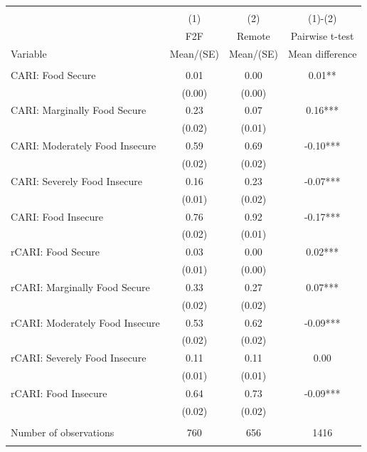
\begin{tabular}{@{\extracolsep{5pt}}lccc}
\\[-1.8ex]\hline \hline \\[-1.8ex]
 & \multicolumn{1}{c}{(1)}  & \multicolumn{1}{c}{(2)}  & \multicolumn{1}{c}{(1)-(2)} \\
 & \multicolumn{1}{c}{F2F}  & \multicolumn{1}{c}{Remote}  & \multicolumn{1}{c}{Pairwise t-test}  \\
Variable & Mean/(SE) & Mean/(SE) & Mean difference \\ \hline \\[-1.8ex] 
CARI: Food Secure   & 0.01    & 0.00    & 0.01**   \\
 & (0.00)  & (0.00)  &  \\ [1ex]
CARI: Marginally Food Secure   & 0.23    & 0.07    & 0.16***   \\
 & (0.02)  & (0.01)  &  \\ [1ex]
CARI: Moderately Food Insecure   & 0.59    & 0.69    & -0.10***   \\
 & (0.02)  & (0.02)  &  \\ [1ex]
CARI: Severely Food Insecure   & 0.16    & 0.23    & -0.07***   \\
 & (0.01)  & (0.02)  &  \\ [1ex]
CARI: Food Insecure   & 0.76    & 0.92    & -0.17***   \\
 & (0.02)  & (0.01)  &  \\ [1ex]
rCARI: Food Secure   & 0.03    & 0.00    & 0.02***   \\
 & (0.01)  & (0.00)  &  \\ [1ex]
rCARI: Marginally Food Secure   & 0.33    & 0.27    & 0.07***   \\
 & (0.02)  & (0.02)  &  \\ [1ex]
rCARI: Moderately Food Insecure   & 0.53    & 0.62    & -0.09***   \\
 & (0.02)  & (0.02)  &  \\ [1ex]
rCARI: Severely Food Insecure   & 0.11    & 0.11    & 0.00   \\
 & (0.01)  & (0.01)  &  \\ [1ex]
rCARI: Food Insecure   & 0.64    & 0.73    & -0.09***   \\
 & (0.02)  & (0.02)  &  \\ [1ex]
\hline \\[-1.8ex]
Number of observations  & 760   & 656  & 1416  \\
\hline \hline \\[-1.8ex]

\end{tabular}
